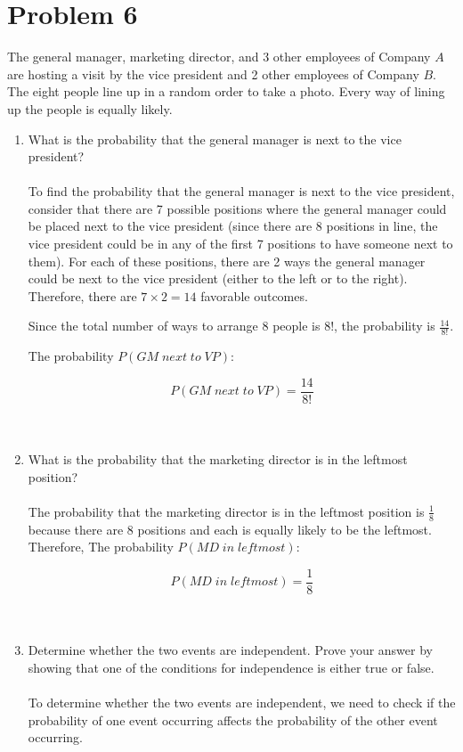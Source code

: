 \documentclass{amsart}
\theoremstyle{definition}
\theoremstyle{Exercise}
\theoremstyle{remark}
\theoremstyle{rule}
\numberwithin{equation}{section}
\begin{document}
  \section*{Problem 6}
The general manager, marketing director, and 3 other employees of Company $A$ are hosting a visit by the vice president and 2 other employees of Company $B$. The eight people line up in a random order to take a photo. Every way of lining up the people is equally likely.
\begin{enumerate}[label=(\alph*)]
  \item What is the probability that the general manager is next to the vice president?
\\\\
To find the probability that the general manager is next to the vice president, consider that there are 7 possible positions where the general manager could be placed next to the vice president (since there are 8 positions in line, the vice president could be in any of the first 7 positions to have someone next to them). For each of these positions, there are 2 ways the general manager could be next to the vice president (either to the left or to the right). Therefore, there are \(7 \times 2 = 14\) favorable outcomes.

Since the total number of ways to arrange 8 people is \(8!\), the probability is \( \frac{14}{8!} \).

The probability \( P(GM \; next \; to \; VP) \):

\[ P(GM \; next \; to \; VP) = \frac{14}{8!} \]
\\\\
  \item What is the probability that the marketing director is in the leftmost position?
\\\\
The probability that the marketing director is in the leftmost position is \( \frac{1}{8} \) because there are 8 positions and each is equally likely to be the leftmost. Therefore, The probability \( P(MD \; in \; leftmost) \):

\[ P(MD \; in \; leftmost) = \frac{1}{8} \]
\\\\
  \item Determine whether the two events are independent. Prove your answer by showing that one of the conditions for independence is either true or false.
 \\\\
To determine whether the two events are independent, we need to check if the probability of one event occurring affects the probability of the other event occurring. 


\end{enumerate}
\end{document}

